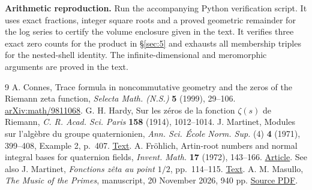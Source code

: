 \documentclass[11pt,reqno]{amsart}
\numberwithin{equation}{section}
\begin{document}
\textbf{Arithmetic reproduction.} Run the accompanying Python verification script. It uses exact fractions, integer square roots and a proved geometric remainder for the log series to certify the volume enclosure given in the text. It verifies three exact zero counts for the product in \S\ref{sec:5} and exhausts all membership triples for the nested-shell identity. The infinite-dimensional and meromorphic arguments are proved in the text.


\begin{thebibliography}{9}
 A. Connes, Trace formula in noncommutative geometry and the zeros of the Riemann zeta function, \emph{Selecta Math. (N.S.)} \textbf{5} (1999), 29--106. \href{https://arxiv.org/abs/math/9811068}{arXiv:math/9811068}.
 G. H. Hardy, Sur les zéros de la fonction \(\zeta(s)\) de Riemann, \emph{C. R. Acad. Sci. Paris} \textbf{158} (1914), 1012--1014.
 J. Martinet, Modules sur l'alg\`ebre du groupe quaternionien, \emph{Ann. Sci. \'Ecole Norm. Sup.} (4) \textbf{4} (1971), 399--408, Example 2, p.~407. \href{https://www.numdam.org/article/ASENS_1971_4_4_3_399_0.pdf}{Text}.
 A. Fr\"ohlich, Artin-root numbers and normal integral bases for quaternion fields, \emph{Invent. Math.} \textbf{17} (1972), 143--166. \href{https://doi.org/10.1007/BF01418937}{Article}. See also J. Martinet, \emph{Fonctions z\^eta au point \(1/2\)}, pp.~114--115. \href{https://www.numdam.org/item/STNG_1971-1972__1__108_0.pdf}{Text}.
 A. M. Masullo, \emph{The Music of the Primes}, manuscript, 20 November 2026, 940 pp. \href{https://math216.wordpress.com/wp-content/uploads/2026/11/the-music-of-the-primes.pdf}{Source PDF}.
\end{thebibliography}
\end{document}
